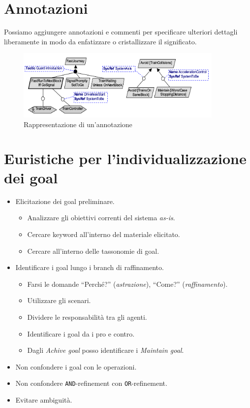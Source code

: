 \section{Annotazioni}
Possiamo aggiungere annotazioni e commenti per specificare ulteriori dettagli liberamente 
in modo da enfatizzare o cristallizzare il significato.
\begin{figure}[H]
    \centering
    \includegraphics[width=0.9\textwidth]{img/annotazionigoal.png}
    \caption{Rappresentazione di un'annotazione}
\end{figure}
\section{Euristiche per l'individualizzazione dei goal}
\begin{itemize}
    \item Elicitazione dei goal preliminare.
    \begin{itemize}
        \item Analizzare gli obiettivi correnti del sistema \textit{as-is}.
        \item Cercare keyword all'interno del materiale elicitato.
        \item Cercare all'interno delle tassonomie di goal.
    \end{itemize}
    \item Identificare i goal lungo i branch di raffinamento.
    \begin{itemize}
        \item Farsi le domande ``Perché?'' (\textit{astrazione}), ``Come?'' (\textit{raffinamento}).
        \item Utilizzare gli scenari.
        \item Dividere le responsabilità tra gli agenti.
        \item Identificare i goal da i pro e contro.
        \item Dagli \textit{Achive goal} posso identificare i \textit{Maintain goal}.
    \end{itemize}
    \item Non confondere i goal con le operazioni.
    \item Non confondere \texttt{AND}-refinement con \texttt{OR}-refinement.
    \item Evitare ambiguità.
\end{itemize}

